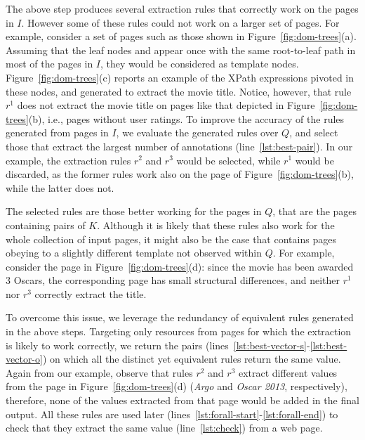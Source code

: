 The above step produces several extraction rules that correctly work on the pages 
in $I$. However some of these rules could not work on a larger set of pages. 
For example, consider a set of pages such as those shown in Figure~\ref{fig:dom-trees}(a). Assuming that the leaf nodes {} and {} appear once with the same root-to-leaf path in most of the pages in $I$, they would be considered as template nodes. Figure~\ref{fig:dom-trees}(c) reports an example of the XPath expressions pivoted in these nodes, and generated to extract the movie title.
%
%
Notice, however, that rule $r^1$ does not extract the movie title on pages like that depicted in Figure~\ref{fig:dom-trees}(b), i.e., pages without user ratings.
To improve the accuracy of the rules generated from pages in $I$, we evaluate the generated rules over $Q$, and select those that extract the largest number of annotations (line~\ref{lst:best-pair}). In our example, the extraction rules $r^2$ and $r^3$ would be selected, while $r^1$ would be discarded, as the former rules work also on the page of Figure~\ref{fig:dom-trees}(b), while the latter does not. 

The selected rules are those better working for the pages in $Q$, that are the pages containing pairs of $K$. Although it is likely that these rules also work for the whole collection of input pages, it might also be the case that {\allpages} contains pages obeying to a slightly different template not observed within $Q$. For example, consider the page in Figure~\ref{fig:dom-trees}(d): since the movie has been awarded 3 Oscars, the corresponding page has small structural differences, and neither $r^1$ nor $r^3$ correctly extract the title. 


To overcome this issue, we leverage the redundancy of equivalent rules generated in the above steps. Targeting only resources from pages for which the extraction is likely to work correctly, we return the pairs (lines~\ref{lst:best-vector-s}-\ref{lst:best-vector-o}) on which all the distinct yet equivalent rules return the same value. Again from our example, observe that rules $r^2$ and $r^3$ extract different values from the page in Figure~\ref{fig:dom-trees}(d) ({\em Argo} and {\em Oscar 2013}, respectively), therefore, none of the values extracted from that page would be added in the final output. 
All these rules are used later (lines~\ref{lst:forall-start}-\ref{lst:forall-end}) to check that they extract the same value (line~\ref{lst:check}) from a web page.


